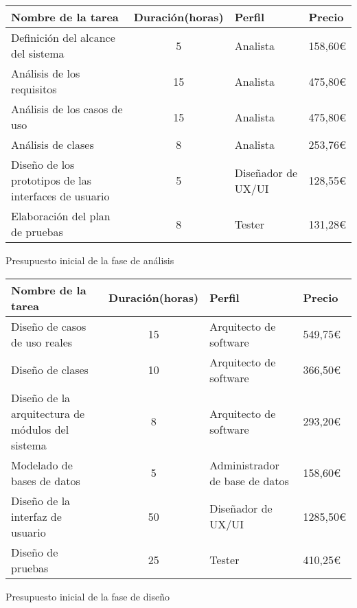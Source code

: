 \begin{planificacion}
	\centering
	\begin{tabular}{ | m{8.5cm} | c | m{2.5cm} |  m{1.5cm} |}
		\hline
		\textbf{Nombre de la tarea}                           & \textbf{Duración(horas)} & \textbf{Perfil}    & \textbf{Precio} \\\hline
		Definición del alcance del sistema                    & 5                        & Analista           & 158,60€         \\\hline
		Análisis de los requisitos                            & 15                       & Analista           & 475,80€         \\\hline
		Análisis de los casos de uso                          & 15                       & Analista           & 475,80€         \\\hline
		Análisis de clases                                    & 8                        & Analista           & 253,76€         \\\hline
		Diseño de los prototipos de las interfaces de usuario & 5                        & Diseñador de UX/UI & 128,55€         \\\hline
		Elaboración del plan de pruebas                       & 8                        & Tester             & 131,28€         \\\hline
	\end{tabular}
	\caption{Presupuesto inicial de la fase de análisis}
\end{planificacion}

\begin{planificacion}
	\centering
	\begin{tabular}{ | m{8.5cm} | c | m{2.5cm} |  m{1.5cm} |}
		\hline
		\textbf{Nombre de la tarea}                      & \textbf{Duración(horas)} & \textbf{Perfil}                & \textbf{Precio} \\\hline
		Diseño de casos de uso reales                    & 15                       & Arquitecto de software         & 549,75€         \\\hline
		Diseño de clases                                 & 10                       & Arquitecto de software         & 366,50€         \\\hline
		Diseño de la arquitectura de módulos del sistema & 8                        & Arquitecto de software         & 293,20€         \\\hline
		Modelado de bases de datos                       & 5                        & Administrador de base de datos & 158,60€         \\\hline
		Diseño de la interfaz de usuario                 & 50                       & Diseñador de UX/UI             & 1285,50€        \\\hline
		Diseño de pruebas                                & 25                       & Tester                         & 410,25€         \\\hline
	\end{tabular}
	\caption{Presupuesto inicial de la fase de diseño}
\end{planificacion}

